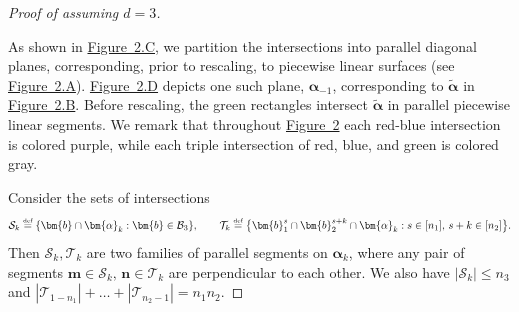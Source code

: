 \documentclass[11pt]{article}
\theoremstyle{definition}
\newcommand*{\eqdef}{\stackrel{\mbox{\normalfont\tiny def}}{=}} %
\newcommand*{\cB}{\mathcal{B}}
\newcommand*{\cS}{\mathcal{S}}
\newcommand*{\cT}{\mathcal{T}}
\begin{document}
\begin{proof}[Proof of  assuming $d = 3$]
\begin{center}
    \end{center}
    As shown in \hyperlink{figtwoC}{Figure~2.C}, we partition the intersections into parallel diagonal planes, corresponding, prior to rescaling, to piecewise linear surfaces (see \hyperlink{figtwoA}{Figure~2.A}). \hyperlink{figtwoD}{Figure~2.D} depicts one such plane, $\bm{\alpha}_{-1}$, corresponding to $\widetilde{\bm{\alpha}}$ in \hyperlink{figtwoB}{Figure~2.B}. Before rescaling, the green rectangles intersect $\widetilde{\bm{\alpha}}$ in parallel piecewise linear segments. We remark that throughout \hyperlink{figtwo}{Figure~2} each red-blue intersection is colored purple, while each triple intersection of red, blue, and green is colored gray. 
    
    Consider the sets of intersections
    \[
    \cS_k \eqdef \{\bm{b} \cap \bm{\alpha}_k : \bm{b} \in \cB_3\}, \qquad \cT_k \eqdef \bigl\{ \bm{b}_1^s \cap \bm{b}_2^{s+k} \cap \bm{\alpha}_k : s \in [n_1], \, s + k \in [n_2] \bigr\}. 
    \]
    Then $\cS_k, \cT_k$ are two families of parallel segments on $\bm{\alpha}_k$, where any pair of segments $\bm{m} \in \cS_k, \, \bm{n} \in \cT_k$ are perpendicular to each other. We also have $|\cS_k| \le n_3$ and $|\cT_{1-n_1}| + \dots + |\cT_{n_2-1}| = n_1n_2$. 


\end{proof}
\end{document}
